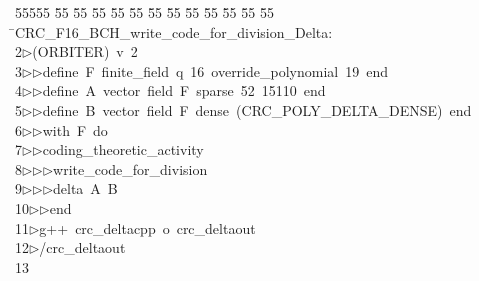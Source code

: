%
%
\begin{tabbing}
55555 \= 55 \= 55 \= 55 \= 55 \= 55 \= 55 \= 55 \= 55 \= 55 \= 55 \= 55 \= 55 \= \>CRC\_F16\_BCH\_write\_code\_for\_division\_Delta:\\[0pt]
2\>$\triangleright$\>(ORBITER)\ v\ 2\ \\[0pt]
3\>$\triangleright$\>$\triangleright$\>define\ F\ finite\_field\ q\ 16\ override\_polynomial\ 19\ end\ \\[0pt]
4\>$\triangleright$\>$\triangleright$\>define\ A\ vector\ field\ F\ sparse\ 52\ 15110\ end\ \\[0pt]
5\>$\triangleright$\>$\triangleright$\>define\ B\ vector\ field\ F\ dense\ (CRC\_POLY\_DELTA\_DENSE)\ end\ \\[0pt]
6\>$\triangleright$\>$\triangleright$\>with\ F\ do\ \\[0pt]
7\>$\triangleright$\>$\triangleright$\>coding\_theoretic\_activity\ \\[0pt]
8\>$\triangleright$\>$\triangleright$\>$\triangleright$\>write\_code\_for\_division\ \\[0pt]
9\>$\triangleright$\>$\triangleright$\>$\triangleright$\>delta\ A\ B\ \\[0pt]
10\>$\triangleright$\>$\triangleright$\>end\\[0pt]
11\>$\triangleright$\>g++\ crc\_deltacpp\ o\ crc\_deltaout\\[0pt]
12\>$\triangleright$\>/crc\_deltaout\\[0pt]
13\>\end{tabbing}
